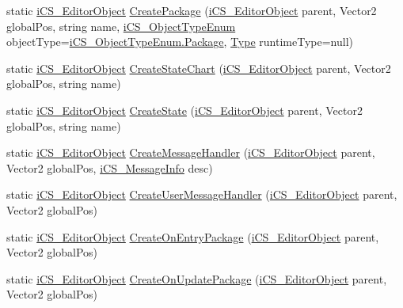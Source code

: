 \begin{DoxyCompactItemize}
\item 
static \hyperlink{classi_c_s___editor_object}{i\+C\+S\+\_\+\+Editor\+Object} \hyperlink{classi_c_s___user_commands_a85b44ccb4d3c65e67f03ae8d7f3e87fc}{Create\+Package} (\hyperlink{classi_c_s___editor_object}{i\+C\+S\+\_\+\+Editor\+Object} parent, Vector2 global\+Pos, string name, \hyperlink{i_c_s___object_type_enum_8cs_ae6c3dd6d8597380b56d94908eb431547}{i\+C\+S\+\_\+\+Object\+Type\+Enum} object\+Type=\hyperlink{i_c_s___object_type_enum_8cs_ae6c3dd6d8597380b56d94908eb431547a209802fb858e2c83205027dbbb5d9e6c}{i\+C\+S\+\_\+\+Object\+Type\+Enum.\+Package}, \hyperlink{i_c_s___object_type_enum_8cs_ae6c3dd6d8597380b56d94908eb431547aa1fa27779242b4902f7ae3bdd5c6d508}{Type} runtime\+Type=null)
\item 
static \hyperlink{classi_c_s___editor_object}{i\+C\+S\+\_\+\+Editor\+Object} \hyperlink{classi_c_s___user_commands_a64093d35db868bd76e552997f7d5ccc8}{Create\+State\+Chart} (\hyperlink{classi_c_s___editor_object}{i\+C\+S\+\_\+\+Editor\+Object} parent, Vector2 global\+Pos, string name)
\item 
static \hyperlink{classi_c_s___editor_object}{i\+C\+S\+\_\+\+Editor\+Object} \hyperlink{classi_c_s___user_commands_a4d0834a7c33487379a59d30286f8b465}{Create\+State} (\hyperlink{classi_c_s___editor_object}{i\+C\+S\+\_\+\+Editor\+Object} parent, Vector2 global\+Pos, string name)
\item 
static \hyperlink{classi_c_s___editor_object}{i\+C\+S\+\_\+\+Editor\+Object} \hyperlink{classi_c_s___user_commands_a7775d70c2c58fa9504e1f14313986d44}{Create\+Message\+Handler} (\hyperlink{classi_c_s___editor_object}{i\+C\+S\+\_\+\+Editor\+Object} parent, Vector2 global\+Pos, \hyperlink{classi_c_s___message_info}{i\+C\+S\+\_\+\+Message\+Info} desc)
\item 
static \hyperlink{classi_c_s___editor_object}{i\+C\+S\+\_\+\+Editor\+Object} \hyperlink{classi_c_s___user_commands_a7c6e601d81ea6ace1a54f52cf65cd91b}{Create\+User\+Message\+Handler} (\hyperlink{classi_c_s___editor_object}{i\+C\+S\+\_\+\+Editor\+Object} parent, Vector2 global\+Pos)
\item 
static \hyperlink{classi_c_s___editor_object}{i\+C\+S\+\_\+\+Editor\+Object} \hyperlink{classi_c_s___user_commands_abe9e2b4f568a3f79e027f2c27dfc53ac}{Create\+On\+Entry\+Package} (\hyperlink{classi_c_s___editor_object}{i\+C\+S\+\_\+\+Editor\+Object} parent, Vector2 global\+Pos)
\item 
static \hyperlink{classi_c_s___editor_object}{i\+C\+S\+\_\+\+Editor\+Object} \hyperlink{classi_c_s___user_commands_a4216d9173ea58782e6c114084ceba0b4}{Create\+On\+Update\+Package} (\hyperlink{classi_c_s___editor_object}{i\+C\+S\+\_\+\+Editor\+Object} parent, Vector2 global\+Pos)

\end{DoxyCompactItemize}
